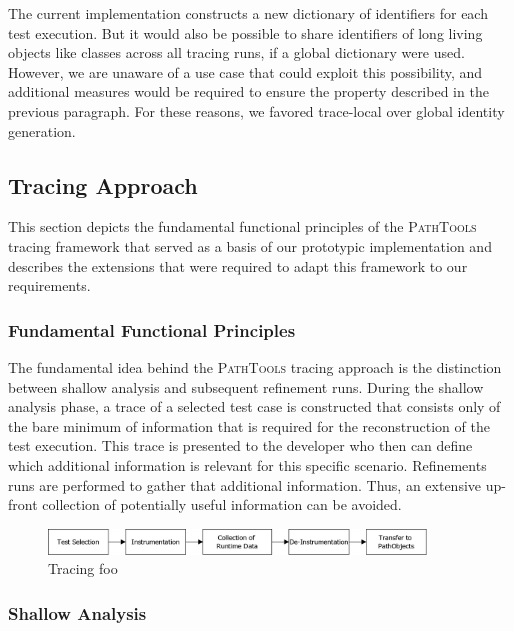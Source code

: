 The current implementation constructs a new dictionary of identifiers for each test execution.
But it would also be possible to share identifiers of long living objects like classes across all tracing runs, if a global dictionary were used.
However, we are unaware of a use case that could exploit this possibility, and additional measures would be required to ensure the property described in the previous paragraph.
For these reasons, we favored trace-local over global identity generation.

\subsection{Tracing Approach}
\label{ss:ImplementationTracingApproach}
This section depicts the fundamental functional principles of the \textsc{PathTools} tracing framework that served as a basis of our prototypic implementation and describes the extensions that were required to adapt this framework to our requirements.

\subsubsection{Fundamental Functional Principles}

The fundamental idea behind the \textsc{PathTools} tracing approach is the distinction between shallow analysis and subsequent refinement runs.
During the shallow analysis phase, a trace of a selected test case is constructed that consists only of the bare minimum of information that is required for the reconstruction of the test execution.
This trace is presented to the developer who then can define which additional information is relevant for this specific scenario.
Refinements runs are performed to gather that additional information.
Thus, an extensive up-front collection of potentially useful information can be avoided. 

\begin{figure}[tb]
	\centering
	\includegraphics[width=0.9\textwidth]{../images/04-Tracing}
	\caption[TOC Caption]{Tracing foo}
	\label{fig:ImplementationTracing}
\end{figure}

\subsubsection{Shallow Analysis}

